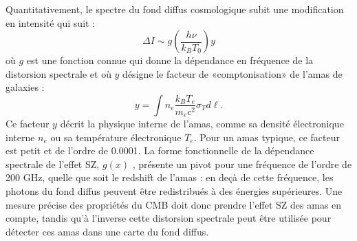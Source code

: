 Quantitativement, le spectre du fond diffus cosmologique subit une modification en intensité qui suit :
\begin{equation}
\Delta I \sim g(\frac{h\nu}{k_B T_0}) y
\end{equation}
où $g$ est une fonction connue qui donne la dépendance en fréquence de la distorsion spectrale et où $y$ désigne le facteur de «comptonisation» de l'amas de galaxies :
\begin{equation}
y=\int n_e \frac{k_B T_e}{m_e c^2} \sigma_T d\ell.
\end{equation} 
Ce facteur $y$ décrit la physique interne de l'amas, comme sa densité électronique interne $n_e$ ou sa température électronique $T_e$. Pour un amas typique, ce facteur est petit et de l'ordre de 0.0001. La forme fonctionnelle de la dépendance spectrale de l'effet SZ, $g(x)$ , présente un pivot pour une fréquence de l'ordre de 200 GHz, quelle que soit le redshift de l'amas : en deçà de cette fréquence, les photons du fond diffus peuvent être redistribués à des énergies supérieures. Une mesure précise des propriétés du CMB doit donc prendre l'effet SZ des amas en compte, tandis qu'à l'inverse cette distorsion spectrale peut être utilisée pour détecter ces amas dans une carte du fond diffus.
